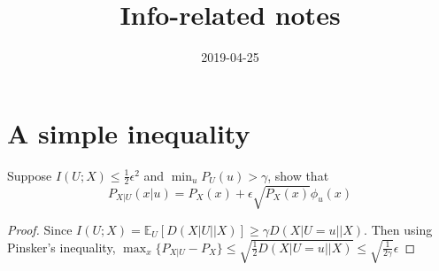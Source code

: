 \documentclass{article}
\title{Info-related notes}
\date{2019-04-25}
\def\E{\mathbb{E}}
\begin{document}
\maketitle
\section{A simple inequality}
Suppose $I(U; X) \leq \frac{1}{2} \epsilon^2$ and $\min_{u} P_U(u) > \gamma$, show that
\begin{equation}
P_{X|U}(x|u) = P_X(x) + \epsilon \sqrt{P_X(x)}\phi_u(x)
\end{equation}
\begin{proof}
Since $I(U;X) = \E_{U}[D(X|U || X)] \geq \gamma D(X|U=u || X)$. Then using Pinsker's inequality,
$\max_{x}\{ P_{X|U}-P_X \} \leq \sqrt{\frac{1}{2} D(X|U=u || X)} \leq \sqrt{\frac{1}{2\gamma}} \epsilon$

\end{proof}
\end{document}
